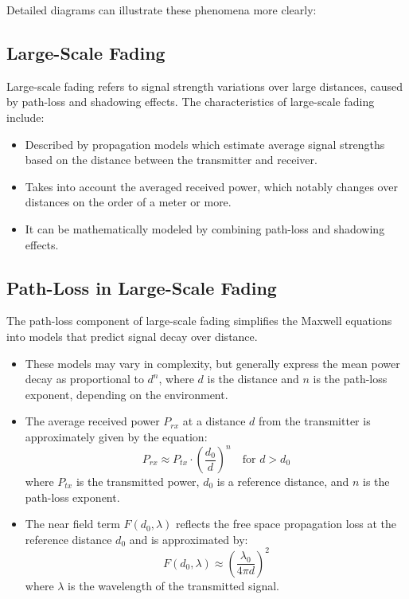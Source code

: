 Detailed diagrams can illustrate these phenomena more clearly:




\subsection*{Large-Scale Fading}

Large-scale fading refers to signal strength variations over large distances, caused by path-loss and shadowing effects. The characteristics of large-scale fading include:

\begin{itemize}
    \item Described by propagation models which estimate average signal strengths based on the distance between the transmitter and receiver.
    \item Takes into account the averaged received power, which notably changes over distances on the order of a meter or more.
    \item It can be mathematically modeled by combining path-loss and shadowing effects.
\end{itemize}

\subsection*{Path-Loss in Large-Scale Fading}

The path-loss component of large-scale fading simplifies the Maxwell equations into models that predict signal decay over distance.

\begin{itemize}
    \item These models may vary in complexity, but generally express the mean power decay as proportional to \(d^n\), where \(d\) is the distance and \(n\) is the path-loss exponent, depending on the environment.
    \item The average received power \(P_{rx}\) at a distance \(d\) from the transmitter is approximately given by the equation:
    \[
    P_{rx} \approx P_{tx} \cdot \left( \frac{d_0}{d} \right)^n \quad \text{for } d > d_0
    \]
    where \(P_{tx}\) is the transmitted power, \(d_0\) is a reference distance, and \(n\) is the path-loss exponent.
    \item The near field term \(F(d_0, \lambda)\) reflects the free space propagation loss at the reference distance \(d_0\) and is approximated by:
    \[
    F(d_0, \lambda) \approx \left( \frac{\lambda_0}{4 \pi d} \right)^2
    \]
    where \(\lambda\) is the wavelength of the transmitted signal.
\end{itemize}

